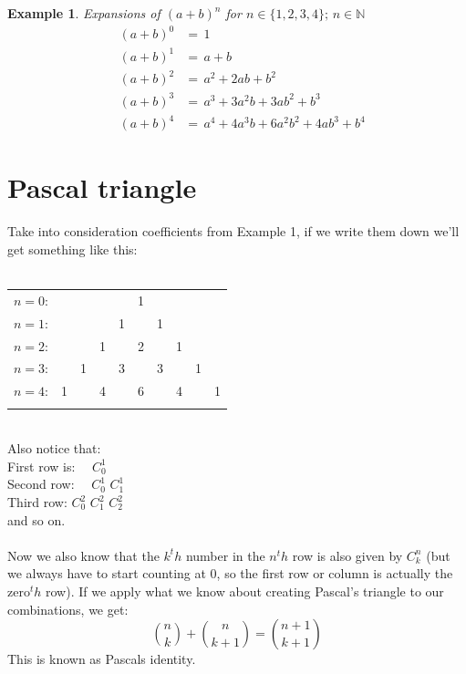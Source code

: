 \documentclass[11pt,a4paper]{article}
\newtheorem{ex}{Example}
\newcommand{\addbinomial}[3][2]{(#2 + #3)^#1}
\begin{document}
\begin{ex}
	Expansions of $(a+b)^n$ for $n \in \{1,2,3,4\}; \, n \in \mathbb{N}$
	\begin{eqnarray}
	&\addbinomial[0]{a}{b}& = \, 1 \nonumber \\
	&\addbinomial[1]{a}{b}& = \, a + b \nonumber\\
	&\addbinomial[2]{a}{b}& = \, a^2 + 2ab + b^2 \nonumber \\
	&\addbinomial[3]{a}{b}& = \, a^3 + 3a^2b + 3ab^2 + b^3 \nonumber \\
	&\addbinomial[4]{a}{b}& = \, a^4 + 4a^3b + 6a^2b^2 + 4ab^3 + b^4 \nonumber  
	\end{eqnarray}
\end{ex}

\section{Pascal triangle}
Take into consideration coefficients from Example 1, if we write them down
we’ll get something like this: 
\\ \\
\begin{tabular}{rccccccccc}
	$n=0$:&    &    &    &    &  1\\\noalign{\smallskip\smallskip}
	$n=1$:&    &    &    &  1 &    &  1\\\noalign{\smallskip\smallskip}
	$n=2$:&    &    &  1 &    &  2 &    &  1\\\noalign{\smallskip\smallskip}
	$n=3$:&    &  1 &    &  3 &    &  3 &    &  1\\\noalign{\smallskip\smallskip}
	$n=4$:&  1 &    &  4 &    &  6 &    &  4 &    &  1\\\noalign{\smallskip\smallskip}
\end{tabular}
\\
Also notice that: \\
First row is: \, \, \qquad $C_0^1$ \\
Second row: \, \, $C_0^1$ \qquad $C_1^1$ \\
Third row: $C_0^2$ \qquad $C_1^2$ \qquad $C_2^2$ \\
and so on.
\\ 
\\
Now we also know that the $k^th$ number in the $n^th$ row is also given by
$C_k^n$ (but we always have to start counting at $0$, so the first row or column is
actually the $\text{zero}^th$ row). If we apply what we know about creating Pascal’s
triangle to our combinations, we get:
$$ {n \choose k} + {n \choose k+1} = {n+1 \choose k+1}$$
This is known as Pascals identity. 
\end{document}
